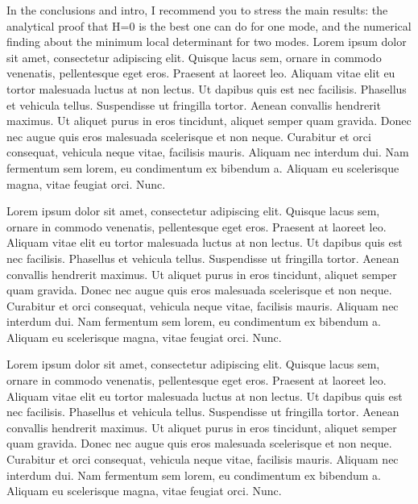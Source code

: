 \documentclass[11pt,a4paper]{article}
\numberwithin{equation}{section}
\begin{document}
	
	In the conclusions and intro, I recommend you to stress the main results: the analytical proof that H=0 is the best one can do for one mode, and the numerical finding about the minimum local determinant for two modes.
	Lorem ipsum dolor sit amet, consectetur adipiscing elit. Quisque lacus sem, ornare in commodo venenatis, pellentesque eget eros. Praesent at laoreet leo. Aliquam vitae elit eu tortor malesuada luctus at non lectus. Ut dapibus quis est nec facilisis. Phasellus et vehicula tellus. Suspendisse ut fringilla tortor. Aenean convallis hendrerit maximus. Ut aliquet purus in eros tincidunt, aliquet semper quam gravida. Donec nec augue quis eros malesuada scelerisque et non neque. Curabitur et orci consequat, vehicula neque vitae, facilisis mauris. Aliquam nec interdum dui. Nam fermentum sem lorem, eu condimentum ex bibendum a. Aliquam eu scelerisque magna, vitae feugiat orci. Nunc.
	
	Lorem ipsum dolor sit amet, consectetur adipiscing elit. Quisque lacus sem, ornare in commodo venenatis, pellentesque eget eros. Praesent at laoreet leo. Aliquam vitae elit eu tortor malesuada luctus at non lectus. Ut dapibus quis est nec facilisis. Phasellus et vehicula tellus. Suspendisse ut fringilla tortor. Aenean convallis hendrerit maximus. Ut aliquet purus in eros tincidunt, aliquet semper quam gravida. Donec nec augue quis eros malesuada scelerisque et non neque. Curabitur et orci consequat, vehicula neque vitae, facilisis mauris. Aliquam nec interdum dui. Nam fermentum sem lorem, eu condimentum ex bibendum a. Aliquam eu scelerisque magna, vitae feugiat orci. Nunc.
	
	Lorem ipsum dolor sit amet, consectetur adipiscing elit. Quisque lacus sem, ornare in commodo venenatis, pellentesque eget eros. Praesent at laoreet leo. Aliquam vitae elit eu tortor malesuada luctus at non lectus. Ut dapibus quis est nec facilisis. Phasellus et vehicula tellus. Suspendisse ut fringilla tortor. Aenean convallis hendrerit maximus. Ut aliquet purus in eros tincidunt, aliquet semper quam gravida. Donec nec augue quis eros malesuada scelerisque et non neque. Curabitur et orci consequat, vehicula neque vitae, facilisis mauris. Aliquam nec interdum dui. Nam fermentum sem lorem, eu condimentum ex bibendum a. Aliquam eu scelerisque magna, vitae feugiat orci. Nunc.
	
	
\end{document}
